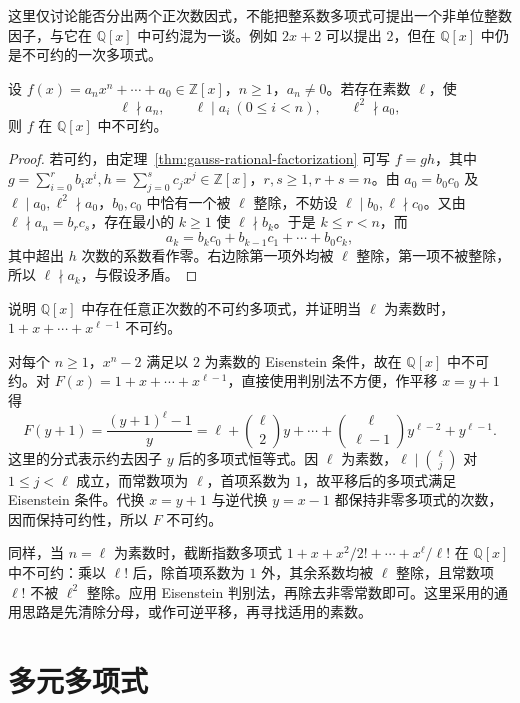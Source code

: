 这里仅讨论能否分出两个正次数因式，不能把整系数多项式可提出一个非单位整数因子，与它在 $\mathbb Q[x]$ 中可约混为一谈。例如 $2x+2$ 可以提出 $2$，但在 $\mathbb Q[x]$ 中仍是不可约的一次多项式。

\begin{theorem}
\label{thm:eisenstein}
设 $f(x)=a_nx^n+\cdots+a_0\in\mathbb Z[x]$，$n\geq1$，$a_n\ne0$。若存在素数 $\ell$，使
\[
    \ell\nmid a_n,\qquad
    \ell\mid a_i\ (0\leq i<n),\qquad
    \ell^2\nmid a_0,
\]
则 $f$ 在 $\mathbb Q[x]$ 中不可约。
\end{theorem}
\begin{proof}
若可约，由定理~\ref{thm:gauss-rational-factorization} 可写 $f=gh$，其中 $g=\sum_{i=0}^r b_ix^i,h=\sum_{j=0}^s c_jx^j\in\mathbb Z[x]$，$r,s\geq1,r+s=n$。由 $a_0=b_0c_0$ 及 $\ell\mid a_0,\ell^2\nmid a_0$，$b_0,c_0$ 中恰有一个被 $\ell$ 整除，不妨设 $\ell\mid b_0,\ell\nmid c_0$。又由 $\ell\nmid a_n=b_rc_s$，存在最小的 $k\geq1$ 使 $\ell\nmid b_k$。于是 $k\leq r<n$，而
\[
    a_k=b_kc_0+b_{k-1}c_1+\cdots+b_0c_k,
\]
其中超出 $h$ 次数的系数看作零。右边除第一项外均被 $\ell$ 整除，第一项不被整除，所以 $\ell\nmid a_k$，与假设矛盾。
\end{proof}

\begin{example}
说明 $\mathbb Q[x]$ 中存在任意正次数的不可约多项式，并证明当 $\ell$ 为素数时，$1+x+\cdots+x^{\ell-1}$ 不可约。
\end{example}
\begin{solve}
对每个 $n\geq1$，$x^n-2$ 满足以 $2$ 为素数的 Eisenstein 条件，故在 $\mathbb Q[x]$ 中不可约。对 $F(x)=1+x+\cdots+x^{\ell-1}$，直接使用判别法不方便，作平移 $x=y+1$ 得
\[
    F(y+1)=\frac{(y+1)^\ell-1}{y}
    =\ell+\binom\ell2y+\cdots+\binom\ell{\ell-1}y^{\ell-2}+y^{\ell-1}.
\]
这里的分式表示约去因子 $y$ 后的多项式恒等式。因 $\ell$ 为素数，$\ell\mid\binom\ell j$ 对 $1\leq j<\ell$ 成立，而常数项为 $\ell$，首项系数为 $1$，故平移后的多项式满足 Eisenstein 条件。代换 $x=y+1$ 与逆代换 $y=x-1$ 都保持非零多项式的次数，因而保持可约性，所以 $F$ 不可约。
\end{solve}

同样，当 $n=\ell$ 为素数时，截断指数多项式 $1+x+x^2/2!+\cdots+x^\ell/\ell!$ 在 $\mathbb Q[x]$ 中不可约：乘以 $\ell!$ 后，除首项系数为 $1$ 外，其余系数均被 $\ell$ 整除，且常数项 $\ell!$ 不被 $\ell^2$ 整除。应用 Eisenstein 判别法，再除去非零常数即可。这里采用的通用思路是先清除分母，或作可逆平移，再寻找适用的素数。

\section{多元多项式}
\label{sec:multivariate-polynomials}

